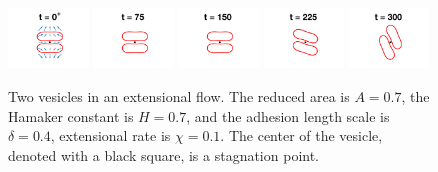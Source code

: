 \documentclass[prf,superscriptaddress,showpacs]{revtex4-1}
\begin{document}
 
\begin{figure}[htp]
  \includegraphics[width = 0.19\textwidth,trim={5cm 2cm 5cm 1cm},clip]{figs/extensional_adR4em1adS7em1Chi1em1_ra070_image01.png}
  \includegraphics[width = 0.19\textwidth,trim={5cm 2cm 5cm 1cm},clip]{figs/extensional_adR4em1adS7em1Chi1em1_ra070_image02.png}
  \includegraphics[width = 0.19\textwidth,trim={5cm 2cm 5cm 1cm},clip]{figs/extensional_adR4em1adS7em1Chi1em1_ra070_image03.png}
  \includegraphics[width = 0.19\textwidth,trim={5cm 2cm 5cm 1cm},clip]{figs/extensional_adR4em1adS7em1Chi1em1_ra070_image04.png}
  \includegraphics[width = 0.19\textwidth,trim={5cm 2cm 5cm 1cm},clip]{figs/extensional_adR4em1adS7em1Chi1em1_ra070_image05.png}
  \caption{\label{fig:extensional4} Two vesicles in an extensional flow.
  The reduced area is $A = 0.7$, the Hamaker constant is $H = 0.7$, and
  the adhesion length scale is $\delta = 0.4$, extensional rate is $\chi
  = 0.1$.  The center of the vesicle, denoted with a black square, is a
  stagnation point.}
\end{figure}
\end{document}
